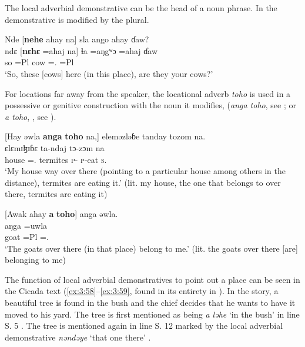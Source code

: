 The local adverbial demonstrative can be the head of a noun phrase. In  the demonstrative is modified by the plural. 

\ea \label{ex:3:55}
Nde  [\textbf{nehe}   ahay   na]  sla  ango ahay  ɗaw?\\
\gll  ndɛ    [\textbf{nɛhɛ}  =ahaj   na]     ɬa   =aŋgʷɔ =ahaj  ɗaw\\
      so     {\DEM}  =Pl  {\PSP}  cow  ={\twoS}.{\POSS}  =Pl {\QUEST}\\
\glt  ‘So, these [cows] here (in this place), are they your cows?’
\z

For locations far away from the speaker, the locational adverb \textit{toho } is used in a possessive or genitive construction with the noun it modifies, (\textit{anga toho},  see ; or  \textit{a toho}, , see ).

\ea \label{ex:3:56}
[Hay  əwla  \textbf{anga} \textbf{toho} na,]  eleməzləɓe  tanday  tozom  na.\\
\gll  [haj   =uwla             \textbf{aŋga} \textbf{tɔhʷɔ}  na]     ɛlɛmɪɮɪɓɛ  ta-ndaj                             tɔ-zɔm  na\\
      house  ={\oneS}.{\POSS}  {\POSS}       {\DEM}                            {\PSP}  termites   \textsc{p}-{\PROG}  \textsc{p}-eat  \textsc{s}.{\DO}\\
\glt  ‘My house way over there (pointing to a particular house among others in the distance), termites are eating it.’ (lit. my house, the one that belongs to over there, termites are eating it)
\z

\ea \label{ex:3:57}
[Awak  ahay  \textbf{a}  \textbf{toho}]  anga  əwla.\\
\gll  [awak  =ahaj  \textbf{a}  \textbf{tɔhʷɔ}]  aŋga  =uwla\\
      goat    =Pl  {\GEN}  {\DEM}  {\POSS}  ={\oneS}.{\POSS}\\
\glt  ‘The goats over there (in that place) belong to me.’ (lit. the goats over there [are] belonging to me)
\z

The function of local adverbial demonstratives to point out a place can be seen in the Cicada text (\ref{ex:3:58}--\ref{ex:3:59}, found in its entirety in ). In the story, a beautiful tree is found in the bush and the chief decides that he wants to have it moved to his yard. The tree is first mentioned as being \textit{a ləhe} ‘in the bush’ in line S. 5 . The tree is mentioned again in line S. 12 marked by the local adverbial demonstrative \textit{nəndəye}\textit{ }‘that one there’ . 


